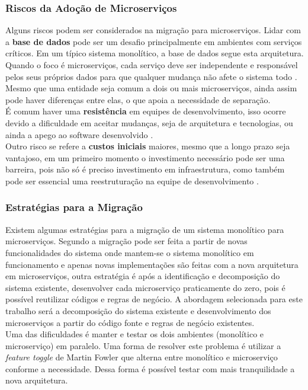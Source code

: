 \documentclass[12pt]{article}
\begin{document}
\subsubsection{Riscos da Adoção de Microserviços}
Alguns riscos podem ser considerados na migração para microserviços. Lidar com a \textbf{base de dados} pode ser um desafio principalmente em ambientes com serviços críticos. Em um típico sistema monolítico, a base de dados segue esta arquitetura. Quando o foco é microserviços, cada serviço deve ser independente e responsável pelos seus próprios dados para que qualquer mudança não afete o sistema todo \cite{Kholy2019}. Mesmo que uma entidade seja comum a dois ou mais microserviços, ainda assim pode haver diferenças entre elas, o que apoia a necessidade de separação. 
\\É comum haver uma \textbf{resistência} em equipes de desenvolvimento, isso ocorre devido a dificuldade em aceitar mudanças, seja de arquitetura e tecnologias, ou ainda a apego ao software desenvolvido \cite{Taibi}. 
\\Outro risco se refere a \textbf{custos iniciais} maiores, mesmo que a longo prazo seja vantajoso, em um primeiro momento o investimento necessário pode ser uma barreira, pois não só é preciso investimento em infraestrutura, como também pode ser essencial uma reestruturação na equipe de desenvolvimento \cite{Taibi}.

\subsubsection{Estratégias para a Migração}

Existem algumas estratégias para a migração de um sistema monolítico para microserviços. Segundo \cite{Taibi} a migração pode ser feita a partir de novas funcionalidades do sistema onde mantem-se o sistema monolítico em funcionamento e apenas novas implementações são feitas com a nova arquitetura em microserviços, outra estratégia é após a identificação e decomposição do sistema existente, desenvolver cada microserviço praticamente do zero, pois é possível reutilizar códigos e regras de negócio. A abordagem selecionada para este trabalho será a decomposição do sistema existente e desenvolvimento dos microserviços a partir do código fonte e regras de negócio existentes. 
\\Uma das dificuldades é manter e testar os dois ambientes (monolítico e microserviço) em paralelo. Uma forma de resolver este problema é utilizar a \textit{feature toggle} de Martin Fowler \cite{Carvalho2019} que alterna entre monolítico e microserviço conforme a necessidade. Dessa forma é possível testar com mais tranquilidade a nova arquitetura. 
\end{document}
